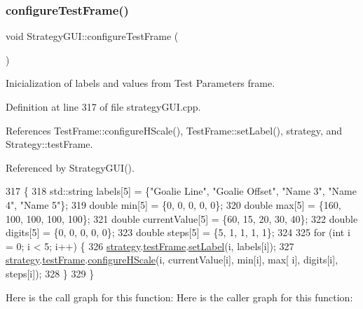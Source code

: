 \subsubsection{\texorpdfstring{configure\+Test\+Frame()}{configureTestFrame()}}
{\footnotesize\ttfamily void Strategy\+G\+U\+I\+::configure\+Test\+Frame (\begin{DoxyParamCaption}{ }\end{DoxyParamCaption})}



Inicialization of labels and values from Test Parameters frame. 



Definition at line 317 of file strategy\+G\+U\+I.\+cpp.



References Test\+Frame\+::configure\+H\+Scale(), Test\+Frame\+::set\+Label(), strategy, and Strategy\+::test\+Frame.



Referenced by Strategy\+G\+U\+I().


\begin{DoxyCode}
317                                      \{
318     std::string labels[5] = \{\textcolor{stringliteral}{"Goalie Line"}, \textcolor{stringliteral}{"Goalie Offset"}, \textcolor{stringliteral}{"Name 3"}, \textcolor{stringliteral}{"Name 4"}, \textcolor{stringliteral}{"Name 5"}\};
319     \textcolor{keywordtype}{double} min[5] = \{0, 0, 0, 0, 0\};
320     \textcolor{keywordtype}{double} max[5] = \{160, 100, 100, 100, 100\};
321     \textcolor{keywordtype}{double} currentValue[5] = \{60, 15, 20, 30, 40\};
322     \textcolor{keywordtype}{double} digits[5] = \{0, 0, 0, 0, 0\};
323     \textcolor{keywordtype}{double} steps[5] = \{5, 1, 1, 1, 1\};
324 
325     \textcolor{keywordflow}{for} (\textcolor{keywordtype}{int} i = 0; i < 5; i++) \{
326         \hyperlink{class_strategy_g_u_i_af8e7b112adca9d3de45cbb0ab00a80bb}{strategy}.\hyperlink{class_strategy_a6fabfc409deb567f30bae2150cfbafad}{testFrame}.\hyperlink{class_test_frame_a125817ea431fb013eaf2b9f11714bd9b}{setLabel}(i, labels[i]);
327         \hyperlink{class_strategy_g_u_i_af8e7b112adca9d3de45cbb0ab00a80bb}{strategy}.\hyperlink{class_strategy_a6fabfc409deb567f30bae2150cfbafad}{testFrame}.\hyperlink{class_test_frame_a11a2d806abe566abbc431bff4b43ab79}{configureHScale}(i, currentValue[i], min[i], max[
      i], digits[i], steps[i]);
328     \}
329 \}
\end{DoxyCode}
Here is the call graph for this function\+:
Here is the caller graph for this function\+:
\mbox{\label{class_strategy_g_u_i_a38540d2d52e6bd3955e85adce92dac41}} 
